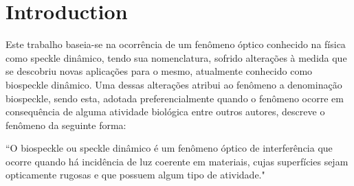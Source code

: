 \documentclass{elsarticle}
\begin{document}
\section{Introduction}

Este trabalho baseia-se na ocorrência de um fenômeno óptico conhecido na física como speckle dinâmico, tendo sua nomenclatura, sofrido alterações à medida que se descobriu novas aplicações para o mesmo, atualmente conhecido como biospeckle dinâmico. Uma dessas alterações atribui ao fenômeno a denominação biospeckle, sendo esta, adotada preferencialmente quando o fenômeno ocorre em consequência de alguma atividade biológica 
\citet{Rodrigues2007} entre outros autores, descreve o fenômeno da seguinte forma:
\begin{citacao} %
“O biospeckle ou speckle dinâmico é um fenômeno óptico de interferência que ocorre quando há incidência de luz coerente em materiais, cujas superfícies sejam opticamente rugosas e que possuem algum tipo de atividade."
\end{citacao}
\end{document}
